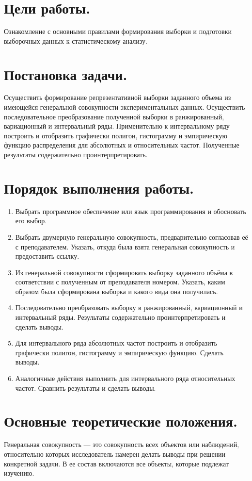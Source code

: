 \setcounter{page}{2}
\section*{Цели работы.}
Ознакомление с основными правилами формирования выборки и подготовки выборочных данных к статистическому анализу.

\section*{Постановка задачи.}
Осуществить формирование репрезентативной выборки заданного объема из имеющейся генеральной
совокупности экспериментальных данных. 
Осуществить последовательное преобразование полученной выборки в ранжированный, 
вариационный и интервальный ряды. 
Применительно к интервальному ряду построить и отобразить графически полигон, 
гистограмму и эмпирическую функцию распределения для абсолютных и относительных частот. 
Полученные результаты содержательно проинтерпретировать.

\section*{Порядок выполнения работы.}
\begin{enumerate}
    \item Выбрать программное обеспечение или язык программирования и обосновать его выбор.
    \item Выбрать двумерную генеральную совокупность, предварительно согласовав её с преподавателем. Указать, откуда была взята генеральная совокупность и предоставить ссылку.
    \item Из генеральной совокупности сформировать выборку заданного объёма в соответствии с полученным от преподавателя номером. Указать, каким образом была сформирована выборка и какого вида она получилась.
    \item Последовательно преобразовать выборку в ранжированный, вариационный и интервальный ряды. Результаты содержательно проинтерпретировать и сделать выводы.
    \item Для интервального ряда абсолютных частот построить и отобразить графически полигон, гистограмму и эмпирическую функцию. Сделать выводы.
    \item Аналогичные действия выполнить для интервального ряда относительных частот. Сравнить результаты и сделать выводы.
\end{enumerate}

\section*{Основные теоретические положения.}
Генеральная совокупность — это совокупность всех объектов или наблюдений, относительно которых исследователь намерен делать выводы при решении конкретной задачи. В ее состав включаются все объекты, которые подлежат изучению.

